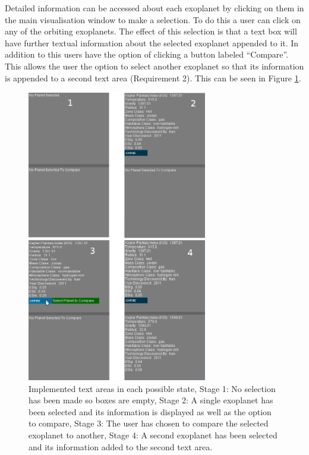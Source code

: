 Detailed information can be accessed about each exoplanet by clicking on them in
the main visualisation window to
make a selection. To do this a user can click on any of the orbiting exoplanets.
The effect of this selection is that a text box will have further textual
information about the selected exoplanet appended to it. In addition to this
users have the option of clicking a button labeled ``Compare''. This allows
the user the option to select another exoplanet so that its information is
appended to a second text area (Requirement 2). This can be seen in Figure
\ref{fig:textBoxes}. 
\clearpage
\begin{figure}[H]
  \centering
      \includegraphics[width=0.7\textwidth]{images/textBoxes.jpg}
  \caption[Implemented text areas in each possible state]{Implemented text areas
in each possible state, Stage 1: No selection has been made so boxes are empty,
Stage 2: A single exoplanet has been selected and its information is displayed
as well as the option to compare, Stage 3: The user has chosen to compare the
selected exoplanet to another, Stage 4: A second exoplanet has been selected and
its information added to the second text area.}
  \label{fig:textBoxes}
\end{figure}
